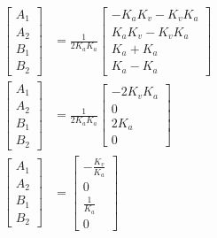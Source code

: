 \begin{align*}
  \begin{bmatrix}
    A_1 \\
    A_2 \\
    B_1 \\
    B_2
  \end{bmatrix} &= \frac{1}{2 K_a K_a}
    \begin{bmatrix}
      -K_a K_v - K_v K_a \\
      K_a K_v - K_v K_a \\
      K_a + K_a \\
      K_a - K_a
    \end{bmatrix} \\
  \begin{bmatrix}
    A_1 \\
    A_2 \\
    B_1 \\
    B_2
  \end{bmatrix} &= \frac{1}{2 K_a K_a}
    \begin{bmatrix}
      -2K_v K_a \\
      0 \\
      2 K_a \\
      0
    \end{bmatrix} \\
  \begin{bmatrix}
    A_1 \\
    A_2 \\
    B_1 \\
    B_2
  \end{bmatrix} &=
    \begin{bmatrix}
      -\frac{K_v}{K_a} \\
      0 \\
      \frac{1}{K_a} \\
      0
    \end{bmatrix}
\end{align*}
